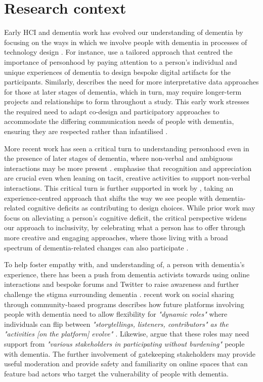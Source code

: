 \section{Research context}
\label{Intro: ResearchContext}
Early HCI and dementia work has evolved our understanding of dementia by focusing on the ways in which we involve people with dementia in processes of technology design \citep{lindsay_empathy_2012, suijkerbuijk_active_2019,vines_configuring_2013,wallace_enabling_2012-1}. For instance, \cite{wallace_design-led_2013} use a tailored approach that centred the importance of personhood by paying attention to a person’s individual and unique experiences of dementia to design bespoke digital artifacts for the participants. Similarly, \cite{lindsay_empathy_2012} describes the need for more interpretative data approaches for those at later stages of dementia, which in turn, may require longer-term projects and relationships to form throughout a study. This early work stresses the required need to adapt co-design and participatory approaches to accommodate the differing communication needs of people with dementia, ensuring they are respected rather than infantilised \citep{morrissey_im_2016,muriana2016you}. 

More recent work has seen a critical turn to understanding personhood even in the presence of later stages of dementia, where non-verbal and ambiguous interactions may be more present \citep{dupuis_re-claiming_2016}. \cite{treadaway_sensor_2016} emphasise that recognition and appreciation are crucial even when leaning on tacit, creative activities to support non-verbal interactions. This critical turn is further supported in work by \cite{morrissey_value_2017}, taking an experience-centred approach that shifts the way we see people with dementia-related cognitive deficits as contributing to design choices. While prior work may focus on alleviating a person's cognitive deficit, the critical perspective widens our approach to inclusivity, by celebrating what a person has to offer through more creative and engaging approaches, where those living with a broad spectrum of dementia-related changes can also participate \citep{lazar_critical_2017}.

To help foster empathy with, and understanding of, a person with dementia's experience, there has been a push from dementia activists towards using online interactions and bespoke forums and Twitter to raise awareness and further challenge the stigma surrounding dementia \citep{talbot_how_2020}. \cite{dai2020making} recent work on social sharing through community-based programs describes how future platforms involving people with dementia need to allow flexibility for \textit{"dynamic roles"} where individuals can flip between \textit{"storytellings, listeners, contributors" as the "activities [on the platform] evolve" \citep[pg.10]{dai2020making}}. Likewise, \cite{johnson_older_2019} argue that these roles may need support from \textit{"various stakeholders in participating without burdening" \citep[pg. 127]{johnson_older_2019}} people with dementia. The further involvement of gatekeeping stakeholders may provide useful moderation and provide safety and familiarity on online spaces that can feature bad actors who target the vulnerability of people with dementia. 

